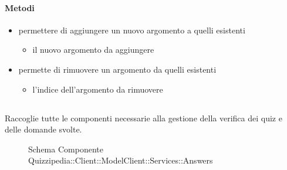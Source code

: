 \paragraph{Metodi}
\begin{itemize}
\item {}
\newline
permettere di aggiungere un nuovo argomento a quelli esistenti
\newline
{}
\newline
\begin{itemize}
\item {}
\newline
il nuovo argomento da aggiungere
\end{itemize}
\item {}
\newline
permette di rimuovere un argomento da quelli esistenti
\newline
{}
\newline
\begin{itemize}
\item {}
\newline
l'indice dell'argomento da rimuovere
\end{itemize}
\end{itemize}
\subsection{}
Raccoglie tutte le componenti necessarie alla gestione della verifica dei quiz e delle domande svolte.
\begin{figure}[H]
\centering
\noindent{}
\caption[Schema Componente Quizzipedia::Client::ModelClient::Services::Answers]{Schema Componente Quizzipedia::Client::ModelClient::Services::Answers}
\end{figure}
